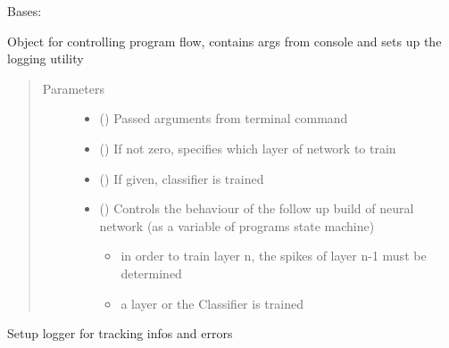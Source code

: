 \documentclass[letterpaper,10pt,english]{sphinxmanual}
\begin{document}
\begin{fulllineitems}
\label{\detokenize{SpikingConvNet:SpikingConvNet.utils.RunControl}}
Bases: 

Object for controlling program flow, contains args from console and sets
up the logging utility
\begin{quote}\begin{description}
\item[{Parameters}] \leavevmode\begin{itemize}
\item {} 
 () \textendash{} Passed arguments from terminal command

\item {} 
 () \textendash{} If not zero, specifies which layer of network to train

\item {} 
 () \textendash{} If given, classifier is trained

\item {} 
 () \textendash{} Controls the behaviour of the follow up build of neural network
(as a variable of programs state machine)
\begin{itemize}
\item {} 
 in order to train layer n, the spikes of layer n-1 must be determined

\item {} 
 a layer or the Classifier is trained

\end{itemize}

\end{itemize}

\end{description}\end{quote}

\begin{fulllineitems}
\label{\detokenize{SpikingConvNet:SpikingConvNet.utils.RunControl.setup_logger}}
Setup logger for tracking infos and errors

\end{fulllineitems}


\end{fulllineitems}
\end{document}
